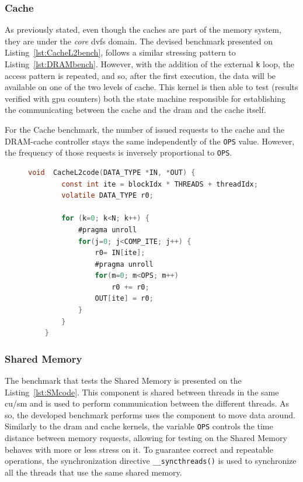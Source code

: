 \subsubsection{Cache}

As previously stated, even though the caches are part of the memory system, they are under the \textit{core} \acrshort{dvfs} domain. The devised benchmark presented on   Listing~\ref{lst:CacheL2bench}, follows a similar stressing pattern to Listing~\ref{lst:DRAMbench}. However, with the addition of the external \texttt{k} loop, the access pattern is repeated, and so, after the first execution, the data will be available on one of the two levels of cache. This kernel is then able to test (results verified with \acrshort{gpu} counters) both the state machine responsible for establishing the communicating between the cache and the \acrshort{dram} and the cache itself.

For the Cache benchmark, the number of issued requests to the cache and the DRAM-cache controller stays the same independently of the \texttt{OPS} value. However, the frequency of those requests is inversely proportional to \texttt{OPS}.

\begin{figure}[h]
    \begin{lstlisting}[language=C, caption=CacheL2 Benchmark Code, label=lst:CacheL2bench, basicstyle=\footnotesize\ttfamily,abovecaptionskip=0pt, captionpos=b]
    void  CacheL2code(DATA_TYPE *IN, *OUT) {
        const int ite = blockIdx * THREADS + threadIdx;
        volatile DATA_TYPE r0;
        
        for (k=0; k<N; k++) {
            #pragma unroll
            for(j=0; j<COMP_ITE; j++) {
                r0= IN[ite];
                #pragma unroll
                for(m=0; m<OPS; m++)    
                    r0 += r0;
                OUT[ite] = r0;
            }
        }
    }
    \end{lstlisting}
\end{figure}

\subsubsection{Shared Memory}

The benchmark that tests the Shared Memory is presented on the Listing~\ref{lst:SMcode}. This component is shared between threads in the same \acrshort{cu}/\acrshort{sm} and is used to perform communication between the different threads. As so, the developed benchmark performs uses the component to move data around. Similarly to the \acrshort{dram} and cache kernels, the variable \texttt{OPS} controls the time distance between memory requests, allowing for testing on the Shared Memory behaves with more or less stress on it. To guarantee correct and repeatable operations, the synchronization directive \texttt{\_\_syncthreads()} is used to synchronize all the threads that use the same shared memory.

